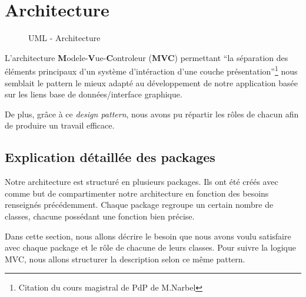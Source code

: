 \chapter{Architecture}
 
\begin{figure}[!h]
\begin{center}
  \caption{UML - Architecture}
  \label{archi} 
\end{center}
\end{figure}

L'architecture \textbf{M}odele-\textbf{V}ue-\textbf{C}ontroleur (\textbf{MVC}) permettant ``la séparation des éléments principaux d'un système d'intéraction d'une couche présentation''\footnote{Citation du cours magistral de PdP de M.Narbel} nous semblait le pattern le mieux adapté au développement de notre application basée sur les liens base de données/interface graphique. 

De plus, grâce à ce \textit{design pattern}, nous avons pu répartir les rôles de chacun afin de produire un travail efficace.

\section{Explication détaillée des packages}

Notre architecture est structuré en plusieurs packages. Ils ont été créés avec comme but de compartimenter notre architecture en fonction des besoins renseignés précédemment. Chaque package regroupe un certain nombre de classes, chacune possédant une fonction bien précise.

Dans cette section, nous allons décrire le besoin que nous avons voulu satisfaire avec chaque package et le rôle de chacune de leurs classes. Pour suivre la logique MVC, nous allons structurer la description selon ce même pattern.

